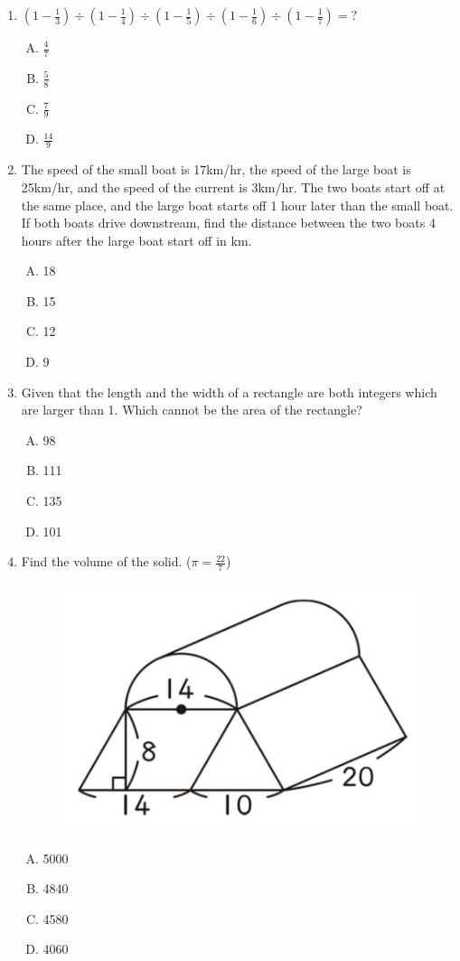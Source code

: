 \documentclass[12pt]{scrartcl}
\begin{document}
\begin{enumerate}[resume]
\item $(1 - \frac{1}{3}) \div (1 - \frac{1}{4}) \div (1 - \frac{1}{5}) \div (1 - \frac{1}{6}) \div (1 - \frac{1}{7}) = ?$
\begin{enumerate}[(A)]
    \item $\frac{4}{7}$ \item $\frac{5}{8}$ \item $\frac{7}{9}$ \item $\frac{14}{9}$
\end{enumerate}

\item The speed of the small boat is 17km/hr, the speed of the large boat is 25km/hr, and the speed of the current is 3km/hr. The two boats start off at the same place, and the large boat starts off 1 hour later than the small boat. If both boats drive downstream, find the distance between the two boats 4 hours after the large boat start off in km.
\begin{enumerate}[(A)]
    \item 18 \item 15 \item 12 \item 9
\end{enumerate}

\item Given that the length and the width of a rectangle are both integers which are larger than 1. Which cannot be the area of the rectangle?
\begin{enumerate}[(A)]
    \item 98 \item 111 \item 135 \item 101
\end{enumerate}

\item Find the volume of the solid. ($\pi = \frac{22}{7}$)
\begin{figure}[h]
    \centering
    \includegraphics{StarGen/0Figure/wmi-2020-6a-volume-of-solid.png}
\end{figure}
\begin{enumerate}[(A)]
    \item 5000 \item 4840 \item 4580 \item 4060
\end{enumerate}


\end{enumerate}
\end{document}
